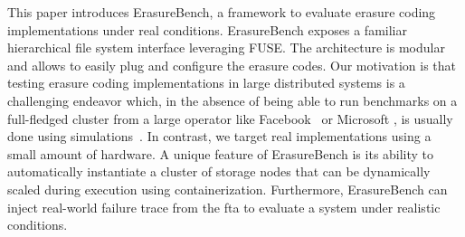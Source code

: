 



This paper introduces ErasureBench, a framework to evaluate erasure coding implementations under real conditions. 
ErasureBench exposes a familiar hierarchical file system interface leveraging FUSE.
The architecture is modular and allows to easily plug and configure the erasure codes.
Our motivation is that testing erasure coding implementations in large distributed systems is a challenging endeavor which, in the absence of being able to run benchmarks on a full-fledged cluster from a large operator like Facebook~\autocite{XorbasVLDB} or Microsoft \cite{DBLP:conf/usenix/HuangSXOCG0Y12}, is usually done using simulations~\autocite{Silberstein2014}. 
In contrast, we target real implementations using a small amount of hardware. 
A unique feature of ErasureBench is its ability to automatically instantiate a cluster of storage nodes that can be dynamically scaled during execution using containerization. %
Furthermore, ErasureBench can inject real-world failure trace from the \ac{fta} \autocite{fta-journal} to evaluate a system under realistic conditions. 

